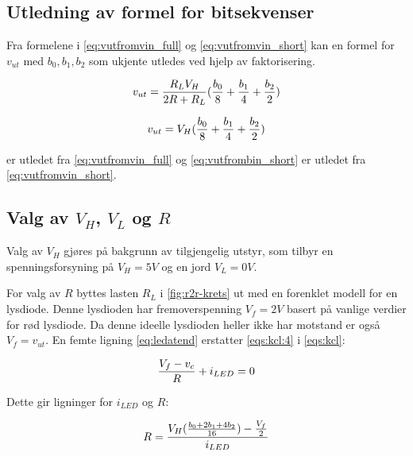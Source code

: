 \documentclass[11pt,a4paper,twocolumn]{article}
\begin{document}
\subsection{Utledning av formel for bitsekvenser}
Fra formelene i \cref{eq:vutfromvin_full} og \cref{eq:vutfromvin_short} kan en formel for $v_{ut}$ med $b_0, b_1, b_2$ som ukjente utledes ved hjelp av faktorisering.

\begin{equation}
v_{ut} = \frac{R_LV_H}{2R + R_L}(\frac{b_0}{8} + \frac{b_1}{4} + \frac{b_2}{2})\\
\label{eq:vutfrombin_full}
\end{equation}

\begin{equation}
v_{ut} = V_H(\frac{b_0}{8} + \frac{b_1}{4} + \frac{b_2}{2})\\
\label{eq:vutfrombin_short}
\end{equation}

 er utledet fra \cref{eq:vutfromvin_full} og \cref{eq:vutfrombin_short} er utledet fra \cref{eq:vutfromvin_short}.

\subsection{Valg av $V_H$, $V_L$ og $R$}
Valg av $V_H$ gjøres på bakgrunn av tilgjengelig utstyr, som tilbyr en spenningsforsyning på $V_H = 5V$ og en jord $V_L = 0V$.

\medskip

For valg av $R$ byttes lasten $R_L$ i \cref{fig:r2r-krets} ut med en forenklet modell for en lysdiode. Denne lysdioden har fremoverspenning $V_f = 2V$ basert på vanlige verdier \cite{analogtech} for rød lysdiode. Da denne ideelle lysdioden heller ikke har motstand er også $V_f = v_{ut}$. En femte ligning \cref{eq:ledatend} erstatter \cref{eqs:kcl:4} i \cref{eqs:kcl}:

\begin{equation}
\label{eq:ledatend}
\frac{V_f - v_c}{R} + i_{LED} = 0\\
\end{equation}

Dette gir ligninger for $i_{LED}$ og $R$:

\begin{equation}
\label{eq:forledR}
R = \frac{V_H(\frac{b_0 + 2b_1 + 4b_2}{16}) - \frac{V_f}{2}}{i_{LED}} \\
\end{equation}
\end{document}
